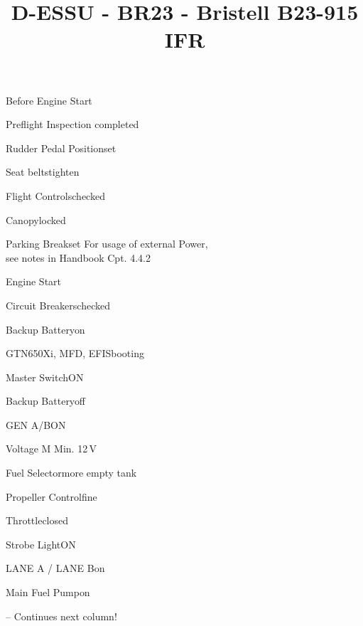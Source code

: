 \def\papersize{5}




\title{D-ESSU  -  BR23  -  Bristell B23-915 IFR}

\begin{checklist}{Before Engine Start}
  \item{Preflight Inspection  }{completed}
  \item{Rudder Pedal Position}{set}
  \item{Seat belts}{tighten}
  \item{Flight Controls}{checked}
  \item{Canopy}{locked}
  \item{Parking Break}{set}
For usage of external Power,\\see notes in Handbook Cpt. 4.4.2
\end{checklist}

\begin{checklist}{Engine Start}
  \item{Circuit Breakers}{checked}
  \item{Backup Battery}{on}
  \item{GTN650Xi, MFD, EFIS}{booting}

  \item{Master Switch}{ON}


  \item{Backup Battery}{off}
  \item{GEN A/B}{ON}
  \item{Voltage M }{Min. 12\,V}
  \item{Fuel Selector}{more empty tank}
  \item{Propeller Control}{fine}
  \item{Throttle}{closed}
  \item{Strobe Light}{ON}
  \item{LANE A / LANE B}{on}
  \item{Main Fuel Pump}{on} 

-- Continues next column!
\end{checklist}

